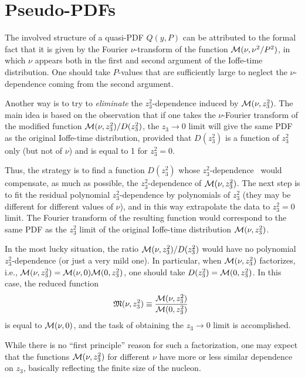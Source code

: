 \section{Pseudo-PDFs}

The involved  structure  of a quasi-PDF
$Q(y,P)$  can be attributed to the formal  fact that it is given by the Fourier $\nu$-transform  of
the function
${\cal M} (\nu, \nu^2/P^2)$,  in which    $\nu$ appears  both in the first and second
argument of the Ioffe-time distribution.
One should take   $P$-values that   are sufficiently large
to neglect the $\nu$-dependence coming from the second argument.

Another way  \cite{Radyushkin:2017cyf} is to try to {\it eliminate}  the \mbox{$z_3^2$-dependence}
induced by ${\cal M} (\nu, z_3^2)$. The main  idea is based
on the observation  that if one takes the
$\nu$-Fourier transform  of the modified function
${\cal M} (\nu, z_3^2)/D(z_3^2)$,  the $z_3\to 0$  limit
will   give the same PDF as the original Ioffe-time distribution,
provided that   $D(z_3^2)$ is a function of $z_3^2$ only
(but not of $\nu$) and is  equal to 1 for \mbox{$z_3^2=0$.}

Thus,  the strategy is to  find a function $D(z_3^2)$ whose \mbox{$z_3^2$-dependence }
would compensate, as much as possible,  the  $z_3^2$-dependence
of  ${\cal M} (\nu, z_3^2)$.
The next step is to fit the residual polynomial $z_3^2$-dependence
by polynomials of $z_3^2$ (they may be different for different values of $\nu$),
and in this way extrapolate the data to $z_3^2=0$ limit.
The Fourier transform
of  the resulting function  would correspond to
 the same PDF  as the $z_3^2$ limit of the original Ioffe-time  distribution
 ${\cal M} (\nu, z_3^2)$.


In the most lucky situation,  the ratio ${\cal M} (\nu, z_3^2)/D(z_3^2)$
would have no polynomial $z_3^2$-dependence  (or just a very mild one).
In particular, when
${\cal M} (\nu, z_3^2)$ factorizes, i.e.,
 ${\cal M} (\nu, z_3^2)= {\cal M} (\nu, 0) {\cal M} (0, z_3^2)$, one should take
  \mbox{$D(z_3^2) ={\cal M} (0, z_3^2)$}.  In this case,
 the reduced function
\begin{align}
{\mathfrak M} (\nu, z_3^2) \equiv \frac{ {\cal M} (\nu, z_3^2)}{{\cal M} (0, z_3^2)} \
 \label{redm}
\end{align}
is equal to $ {\cal M} (\nu, 0)$,
and
the  task  of obtaining  the $z_3\to 0$ limit is accomplished.

While there is no ``first principle'' reason for such a factorization,
one may expect that  the functions ${\cal M} (\nu, z_3^2)$
 for different $\nu$ have more or less similar dependence on $z_3$,
basically
reflecting the finite size of the nucleon.

